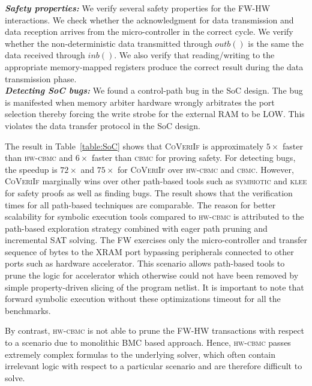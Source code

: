 \documentclass[sigconf]{acmart}
\newcommand{\tool}[1]{\textsc{#1}\xspace}
\newcommand{\cbmcv}{\tool{cbmc}}
\newcommand{\hwcbmcv}{\tool{hw-cbmc}}
\newcommand{\verifox}{\tool{CoVeriIf}}
\newcommand{\klee}{\tool{klee}}
\newcommand{\symbiotic}{\tool{symbiotic}}
\begin{document}
\textbf{\emph{Safety properties:}}
%
We verify several safety properties for the FW-HW interactions.  We check
whether the acknowledgment for data transmission and data reception arrives
from the micro-controller in the correct cycle.  We verify whether the
non-deterministic data transmitted through $outb()$ is the same
the data received through $inb()$.  We also verify that
reading/writing to the appropriate memory-mapped registers produce the
correct result during the data transmission phase.\\ \textbf{\emph{Detecting
SoC bugs:}} We found a control-path bug in the SoC design.  The bug is
manifested when memory arbiter hardware wrongly arbitrates the port
selection thereby forcing the write strobe for the external RAM to be LOW. 
This violates the data transfer protocol in the SoC design.

The result in Table~\ref{table:SoC} shows that \verifox is approximately
$5\times$ faster than \hwcbmcv and $6\times$ faster than \cbmcv for proving
safety.  For detecting bugs, the speedup is $72\times$ and $75\times$ for
\verifox over \hwcbmcv and \cbmcv.  However, \verifox marginally wins over
other path-based tools such as \symbiotic and \klee for safety proofs as
well as finding bugs. The result shows that the verification times for all
path-based techniques are comparable.  The reason for better scalability for
symbolic execution tools compared to \hwcbmcv is attributed to the path-based 
exploration strategy combined with eager path pruning and incremental SAT
solving. The FW exercises only the micro-controller
and transfer sequence of bytes to the XRAM port bypassing peripherals
connected to other ports such as hardware accelerator.  This scenario
allows path-based tools to prune the logic for accelerator which otherwise
could not have been removed by simple property-driven slicing of the
program netlist.  It is important to note that forward symbolic execution without
these optimizations timeout for all the benchmarks.

By contrast, \hwcbmcv is not able to prune the FW-HW transactions with
respect to a scenario due to monolithic BMC based approach.  Hence, \hwcbmcv
passes extremely complex formulas to the underlying solver, which often
contain irrelevant logic with respect to a particular scenario and are
therefore difficult to solve.

\end{document}
